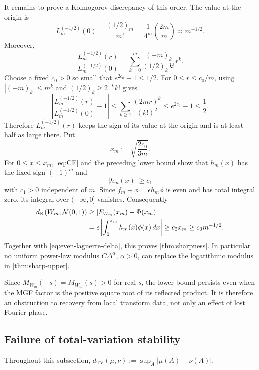It remains to prove a Kolmogorov discrepancy of this order. The value at the origin is
\[
L_m^{(-1/2)}(0)=\frac{(1/2)_m}{m!}
=\frac1{4^m}\binom{2m}{m}\asymp m^{-1/2}.
\]
Moreover,
\begin{equation}\label{eq:laguerre-origin-series}
\frac{L_m^{(-1/2)}(r)}{L_m^{(-1/2)}(0)}
=\sum_{k=0}^m
\frac{(-m)_k}{(1/2)_k\,k!}r^k.
\end{equation}
Choose a fixed $c_0>0$ so small that $e^{2c_0}-1\le1/2$. For $0\le r\le c_0/m$, using $|(-m)_k|\le m^k$ and $(1/2)_k\ge2^{-k}k!$ gives
\[
\left|
\frac{L_m^{(-1/2)}(r)}{L_m^{(-1/2)}(0)}-1
\right|
\le\sum_{k\ge1}\frac{(2mr)^k}{(k!)^2}
\le e^{2c_0}-1\le\frac12.
\]
Therefore $L_m^{(-1/2)}(r)$ keeps the sign of its value at the origin and is at least half as large there. Put
\[
x_m:=\sqrt{\frac{2c_0}{3m}}.
\]
For $0\le x\le x_m$, \eqref{eq:CE} and the preceding lower bound show that $h_m(x)$ has the fixed sign $(-1)^m$ and
\[
|h_m(x)|\ge c_1
\]
with $c_1>0$ independent of $m$. Since $f_m-\phi=\epsilon h_m\phi$ is even and has total integral zero, its integral over $(-\infty,0]$ vanishes. Consequently
\[
\begin{aligned}
d_{\mathrm K}(W_m,\mathcal N(0,1))
&\ge |F_{W_m}(x_m)-\Phi(x_m)|\\
&=\epsilon\left|\int_0^{x_m}h_m(x)\phi(x)\,dx\right|
\ge c_2x_m
\ge c_3m^{-1/2}.
\end{aligned}
\]
Together with \eqref{eq:even-laguerre-delta}, this proves \cref{thm:sharpness}. In particular no uniform power-law modulus $C\Delta^\alpha$, $\alpha>0$, can replace the logarithmic modulus in \cref{thm:sharp-upper}.

Since $M_{W_m}(-s)=M_{W_m}(s)>0$ for real $s$, the lower bound persists even when the MGF factor is the positive square root of its reflected product. It is therefore an obstruction to recovery from local transform data, not only an effect of lost Fourier phase.

\subsection{Failure of total-variation stability}

Throughout this subsection, $d_{\mathrm{TV}}(\mu,\nu):=\sup_A|\mu(A)-\nu(A)|$.


